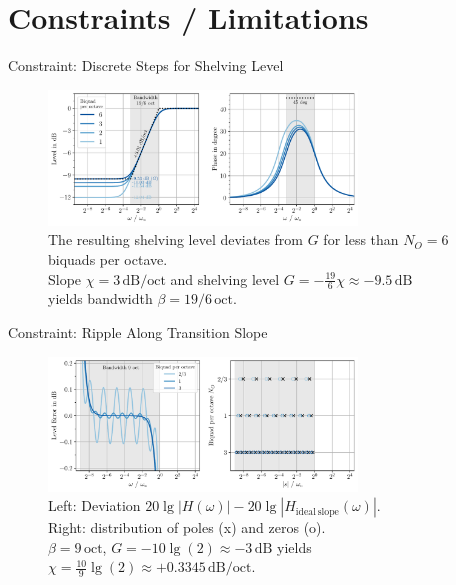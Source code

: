 \documentclass[mathserif,aspectratio=169]{beamer}
\newcommand{\tw}{0.73}
\begin{document}
\section{Constraints / Limitations}
\begin{frame}{Constraint: Discrete Steps for Shelving Level}
\begin{figure}
\captionsetup{width=.78\linewidth}
\includegraphics[width=\tw\textwidth]{../graphics/gain-error.pdf}
\caption{The resulting shelving level deviates from $G$ for less than $N_O=6$
biquads per octave.\\
Slope $\chi = 3\,\mathrm{dB/oct}$ and shelving
level $G=-\frac{19}{6}\chi \approx - 9.5\,\mathrm{dB}$\\yields bandwidth
$\beta = 19/6\,\mathrm{oct}$.
}
\label{fig:gain-error}
\end{figure}
\end{frame}
%
%
%
\begin{frame}{Constraint: Ripple Along Transition Slope}
\begin{figure}
\captionsetup{width=.6\linewidth}
\includegraphics[width=\tw\textwidth]{../graphics/ripple-and-zp-frequency.pdf}
\caption{
Left: Deviation $20\lg|H(\omega)|-20\lg|H_\mathrm{ideal\,slope}(\omega)|$.\\
Right: distribution of poles (x) and zeros (o).\\
$\beta=9\,\mathrm{oct}$,
$G=-10\lg(2)\approx -3\,\mathrm{dB}$ yields\\
$\chi =  \frac{10}{9}\lg(2) \approx + 0.3345\,\mathrm{dB/oct}$.
}
\label{fig:ripple-and-zp-frequency}
\end{figure}
\end{frame}
%
%
%
\end{document}

